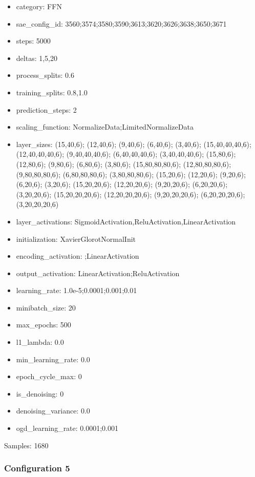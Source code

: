 \documentclass[a4paper,11pt,oneside]{article}
\theoremstyle{plain}
\theoremstyle{definition}
\begin{document}
\begin{itemize}
	\item category: FFN
	\item sae\_config\_id: 3560;3574;3580;3590;3613;3620;3626;3638;3650;3671
	\item steps: 5000
	\item deltas: 1,5,20
	\item process\_splits: 0.6
	\item training\_splits: 0.8,1.0
	\item prediction\_steps: 2
	\item scaling\_function: NormalizeData;LimitedNormalizeData
	\item layer\_sizes: (15,40,6); (12,40,6); (9,40,6); (6,40,6); (3,40,6); (15,40,40,40,6); (12,40,40,40,6); (9,40,40,40,6); (6,40,40,40,6); (3,40,40,40,6); (15,80,6);(12,80,6); (9,80,6); (6,80,6); (3,80,6); (15,80,80,80,6); (12,80,80,80,6); (9,80,80,80,6); (6,80,80,80,6); (3,80,80,80,6); (15,20,6); (12,20,6); (9,20,6); (6,20,6); (3,20,6); (15,20,20,6); (12,20,20,6); (9,20,20,6); (6,20,20,6); (3,20,20,6); (15,20,20,20,6); (12,20,20,20,6); (9,20,20,20,6); (6,20,20,20,6); (3,20,20,20,6)
	\item layer\_activations: SigmoidActivation,ReluActivation,LinearActivation
	\item initialization: XavierGlorotNormalInit
	\item encoding\_activation: ;LinearActivation
	\item output\_activation: LinearActivation;ReluActivation
	\item learning\_rate: 1.0e-5;0.0001;0.001;0.01
	\item minibatch\_size: 20
	\item max\_epochs: 500
	\item l1\_lambda: 0.0
	\item min\_learning\_rate: 0.0
	\item epoch\_cycle\_max: 0
	\item is\_denoising: 0
	\item denoising\_variance: 0.0
	\item ogd\_learning\_rate: 0.0001;0.001
\end{itemize}

Samples: 1680

\subsubsection{Configuration 5}\label{config5}
\end{document}
